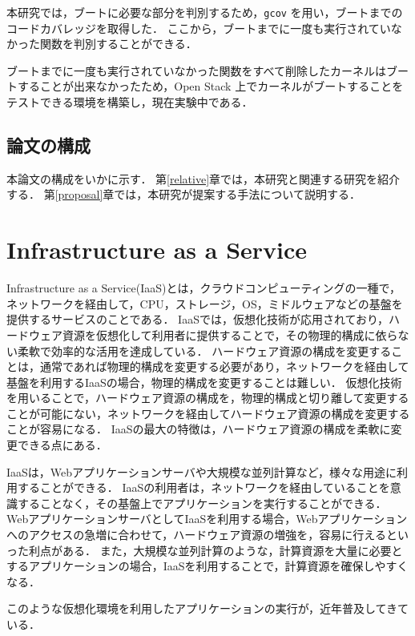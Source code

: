 \documentclass[graduation-thesis]{mlarticle}
\begin{document}
本研究では，ブートに必要な部分を判別するため，\texttt{gcov} を用い，ブートまでのコードカバレッジを取得した．
ここから，ブートまでに一度も実行されていなかった関数を判別することができる．

ブートまでに一度も実行されていなかった関数をすべて削除したカーネルはブートすることが出来なかったため，Open Stack 上でカーネルがブートすることをテストできる環境を構築し，現在実験中である．

\subsection {論文の構成}
\label{intro:arch}
本論文の構成をいかに示す．
第\ref{relative}章では，本研究と関連する研究を紹介する．
第\ref{proposal}章では，本研究が提案する手法について説明する．


\clearpage
\section{Infrastructure as a Service}
Infrastructure as a Service(IaaS)とは，クラウドコンピューティングの一種で，ネットワークを経由して，CPU，ストレージ，OS，ミドルウェアなどの基盤を提供するサービスのことである．
IaaSでは，仮想化技術が応用されており，ハードウェア資源を仮想化して利用者に提供することで，その物理的構成に依らない柔軟で効率的な活用を達成している．
ハードウェア資源の構成を変更することは，通常であれば物理的構成を変更する必要があり，ネットワークを経由して基盤を利用するIaaSの場合，物理的構成を変更することは難しい．
仮想化技術を用いることで，ハードウェア資源の構成を，物理的構成と切り離して変更することが可能にない，ネットワークを経由してハードウェア資源の構成を変更することが容易になる．
IaaSの最大の特徴は，ハードウェア資源の構成を柔軟に変更できる点にある．

IaaSは，Webアプリケーションサーバや大規模な並列計算など，様々な用途に利用することができる．
IaaSの利用者は，ネットワークを経由していることを意識することなく，その基盤上でアプリケーションを実行することができる．
WebアプリケーションサーバとしてIaaSを利用する場合，Webアプリケーションへのアクセスの急増に合わせて，ハードウェア資源の増強を，容易に行えるといった利点がある．
また，大規模な並列計算のような，計算資源を大量に必要とするアプリケーションの場合，IaaSを利用することで，計算資源を確保しやすくなる．

このような仮想化環境を利用したアプリケーションの実行が，近年普及してきている．
\end{document}
